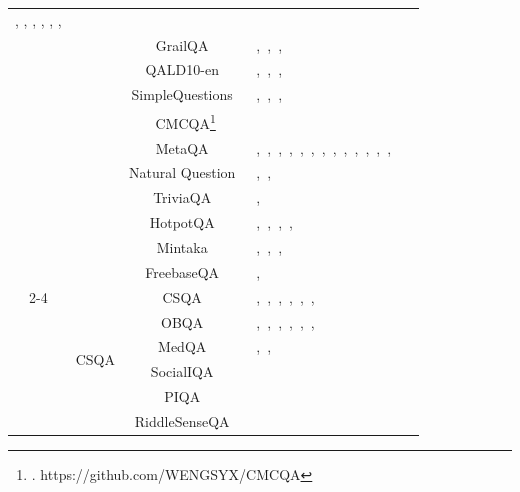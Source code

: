 \documentclass[acmsmall]{acmart}
\begin{document}
\begin{table}[htbp]
{\begin{tabular}{ccclc}
{ \cite{ref:gge}, \cite{ref:rasr}, \cite{ref:unikgqa}, \cite{ref:noname6}, \cite{ref:nsm}, \cite{ref:nutrea}, \cite{ref:ewek-qa}} &  \\
          &       & GrailQA~\cite{ref:grailqa} &\cite{ref:tog},~\cite{ref:kg-agent},~\cite{ref:tiara},~\cite{ref:ewek-qa} &  \\
          &       & QALD10-en~\cite{ref:qald} &\cite{ref:tog},~\cite{ref:tog2},~\cite{ref:noname6},~\cite{ref:oda} &  \\
          &       & SimpleQuestions~\cite{ref:simple} &\cite{ref:tog},~\cite{ref:difar},~\cite{ref:memnns},~\cite{ref:ewek-qa} &  \\
          &       & CMCQA\footnote{. https://github.com/WENGSYX/CMCQA} &\cite{ref:rok}   &  \\
          &       & MetaQA~\cite{ref:metaqa} & \multicolumn{1}{p{30.59em}}{\cite{ref:rog},~\cite{ref:rra},~\cite{ref:kn},~\cite{ref:kg-gpt},~\cite{ref:keqing},~\cite{ref:rearev},~\cite{ref:pullnet},~\cite{ref:embedkgqa},~\cite{ref:structgpt},~\cite{ref:etd},~\cite{ref:nsm},~\cite{ref:unikgqa},~\cite{ref:nutrea},~\cite{ref:kelp}} &  \\
          &       & Natural Question~\cite{ref:nq} &\cite{ref:oreolm},~\cite{ref:kalmv},~\cite{ref:ewek-qa} &  \\
          &       & TriviaQA~\cite{ref:triviaqa} &\cite{ref:oreolm},~\cite{ref:unikgqa} &  \\
          &       & HotpotQA~\cite{ref:hotpotqa} &\cite{ref:oreolm},~\cite{ref:hipporag},~\cite{ref:tog2},~\cite{ref:kalmv},~\cite{ref:ewek-qa} &  \\
          &       & Mintaka~\cite{ref:mintaka} &\cite{ref:difar},~\cite{ref:noname6},~\cite{ref:kaping},~\cite{ref:kalmv} &  \\
          &       & FreebaseQA~\cite{ref:freebaseqa} &\cite{ref:decaf},~\cite{ref:rasr} &  \\
\cmidrule{2-4}          & \multirow{6}[2]{*}{CSQA} & CSQA~\cite{ref:commonsenseqa}  &\cite{ref:grapeqa},~\cite{ref:qa-gnn},~\cite{ref:mvp-tuning},~\cite{ref:noname2},~\cite{ref:kagnet},~\cite{ref:ksl},~\cite{ref:hamqa} &  \\
          &       & OBQA~\cite{ref:openbookqa}  &\cite{ref:grapeqa},~\cite{ref:qa-gnn},~\cite{ref:mvp-tuning},~\cite{ref:noname2},~\cite{ref:ksl},~\cite{ref:opencsr},~\cite{ref:hamqa} &  \\
          &       & MedQA~\cite{ref:medqa} & \cite{ref:grapeqa},~\cite{ref:ksl},~\cite{ref:dalk} &  \\
          &       & SocialIQA~\cite{ref:socialIQA} &\cite{ref:mvp-tuning} &  \\
          &       & PIQA~\cite{ref:piqa}  &\cite{ref:mvp-tuning} &  \\
          &       & RiddleSenseQA~\cite{ref:riddle} &\cite{ref:mvp-tuning} &  \\


\end{tabular}}
\end{table}
\end{document}
